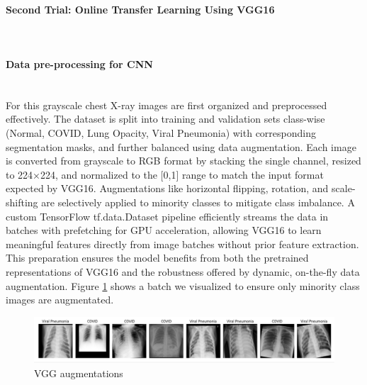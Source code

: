 \documentclass{article}
\begin{document}
\paragraph{Second Trial: Online Transfer Learning Using VGG16}\mbox{}\\
\paragraph{Data pre-processing for CNN}\mbox{}\\
 For this grayscale chest X-ray images are first organized and preprocessed effectively. The dataset is split into training and validation sets class-wise (Normal, COVID, Lung Opacity, Viral Pneumonia) with corresponding segmentation masks, and further balanced using data augmentation. Each image is converted from grayscale to RGB format by stacking the single channel, resized to 224×224, and normalized to the [0,1] range to match the input format expected by VGG16. Augmentations like horizontal flipping, rotation, and scale-shifting are selectively applied to minority classes to mitigate class imbalance. A custom TensorFlow tf.data.Dataset pipeline efficiently streams the data in batches with prefetching for GPU acceleration, allowing VGG16 to learn meaningful features directly from image batches without prior feature extraction. This preparation ensures the model benefits from both the pretrained representations of VGG16 and the robustness offered by dynamic, on-the-fly data augmentation.
Figure \ref{fig:vgg16augmentations.png} shows a batch we visualized to ensure only minority class images are augmentated.
\begin{figure}[h!] %
    \centering
    \includegraphics[width=1.0\linewidth]{vgg16augmentations.png}
    \caption{VGG augmentations}
    \label{fig:vgg16augmentations.png}
\end{figure}
\end{document}
